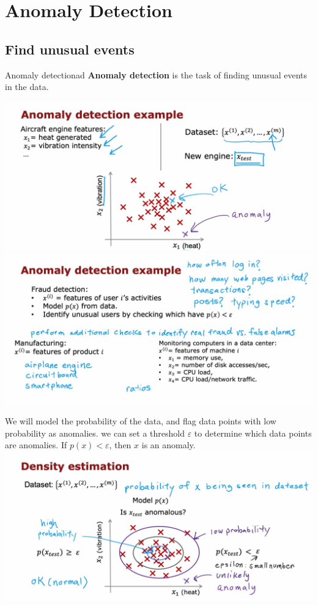 \chapter{Anomaly Detection}
\section{Find unusual events}
\begin{dfnbox}{Anomaly detection}{ad}
\textbf{Anomaly detection} is the task of finding unusual events in the data.
\end{dfnbox}
\includegraphics*[width=\textwidth]{images/a1}
\vspace{1em}
\includegraphics*[width=\textwidth]{images/a3}\par
We will model the probability of the data, and flag data points with low probability as anomalies.
we can set a threshold $\varepsilon$ to determine which data points are anomalies.
If $p(x) < \varepsilon$, then $x$ is an anomaly.\\
\includegraphics*[width=\textwidth]{images/a2}

